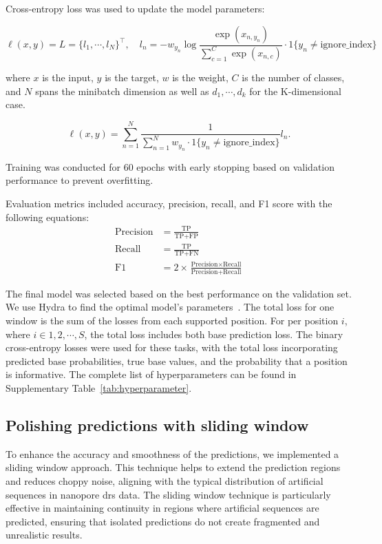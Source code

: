 \documentclass[pdflatex, sn-mathphys-num, lineno]{sn-jnl}%
\theoremstyle{thmstyleone}%
\theoremstyle{thmstyletwo}%
\theoremstyle{thmstylethree}%
\begin{document}
Cross-entropy loss was used to update the model parameters:

\[
	\ell(x, y) = L = \{l_1,\cdots,l_N\}^\top, \quad
	l_n = - w_{y_n} \log \frac{\exp(x_{n,y_n})}{\sum_{c=1}^C \exp(x_{n,c})}
	\cdot 1\{y_n \not= \textrm{ignore\_index}\}
\]

where \( x \) is the input, \( y \) is the target, \( w \) is the weight,
\( C \) is the number of classes, and \( N \) spans the minibatch dimension as well as
\( d_1, \cdots, d_k \) for the K-dimensional case.

\[
	\ell(x, y) =   \sum_{n=1}^N \frac{1}{\sum_{n=1}^N w_{y_n} \cdot 1\{y_n \not= \textrm{ignore\_index}\}} l_n
	.\]

Training was conducted for \num{60} epochs with early stopping based on validation performance to prevent overfitting.

Evaluation metrics included accuracy, precision, recall, and F1 score with the following equations:
\begin{align*}
	\textrm{Precision} & = \frac{\textrm{TP}}{\textrm{TP}+\textrm{FP}}                                                     \\
	\textrm{Recall}    & = \frac{\textrm{TP}}{\textrm{TP}+\textrm{FN}}                                                     \\
	\textrm{F1}        & = 2 \times \frac{\textrm{Precision} \times \textrm{Recall}}{\textrm{Precision} + \textrm{Recall}}
\end{align*}

The final model was selected based on the best performance on the validation set.
We use Hydra to find the optimal model's parameters~\cite{Yadan2019Hydra}.
The total loss for one window is the sum of the losses from each supported position.
For per position  \( i \), where \( i  \in {1, 2, \cdots, S} \),  the total loss includes both base prediction loss.
The binary cross-entropy losses were used for these tasks, with the total loss incorporating predicted base probabilities, true base values, and the probability that a position is informative.
The complete list of hyperparameters can be found in Supplementary Table~\ref{tab:hyperparameter}.

\subsection{Polishing predictions with sliding window}

To enhance the accuracy and smoothness of the predictions, we implemented a sliding window approach.
This technique helps to extend the prediction regions and reduces choppy noise, aligning with the typical distribution of artificial sequences in nanopore \gls{drs} data.
The sliding window technique is particularly effective in maintaining continuity in regions where artificial sequences are predicted, ensuring that isolated predictions do not create fragmented and unrealistic results.
\end{document}
